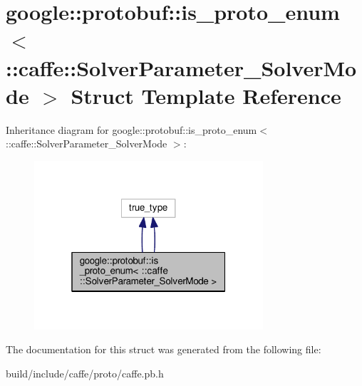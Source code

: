 \hypertarget{structgoogle_1_1protobuf_1_1is__proto__enum_3_01_1_1caffe_1_1_solver_parameter___solver_mode_01_4}{}\section{google\+:\+:protobuf\+:\+:is\+\_\+proto\+\_\+enum$<$ \+:\+:caffe\+:\+:Solver\+Parameter\+\_\+\+Solver\+Mode $>$ Struct Template Reference}
\label{structgoogle_1_1protobuf_1_1is__proto__enum_3_01_1_1caffe_1_1_solver_parameter___solver_mode_01_4}


Inheritance diagram for google\+:\+:protobuf\+:\+:is\+\_\+proto\+\_\+enum$<$ \+:\+:caffe\+:\+:Solver\+Parameter\+\_\+\+Solver\+Mode $>$\+:
\nopagebreak
\begin{figure}[H]
\begin{center}
\leavevmode
\includegraphics[width=241pt]{structgoogle_1_1protobuf_1_1is__proto__enum_3_01_1_1caffe_1_1_solver_parameter___solver_mode_01_4__inherit__graph}
\end{center}
\end{figure}


The documentation for this struct was generated from the following file\+:\begin{DoxyCompactItemize}
\item 
build/include/caffe/proto/caffe.\+pb.\+h\end{DoxyCompactItemize}
